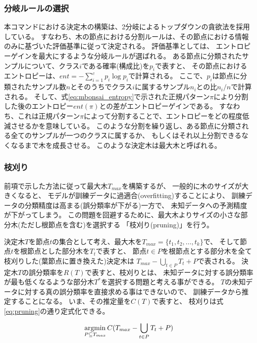 \subsubsection{分岐ルールの選択}
本コマンドにおける決定木の構築は、2分岐によるトップダウンの貪欲法を採用している。
すなわち、木の節点における分割ルールは、その節点における情報のみに基づいた評価基準に従って決定される。
評価基準としては、
エントロピーゲインを最大にするような分岐ルールが選ばれる。
ある節点に分類されたサンプルについて、クラス$i$である確率(構成比)を$p_i$で表すと、
その節点におけるエントロピーは、$ent=-\sum_{i=1}^c p_i \log{p_i}$で計算される。
ここで、$p_i$は節点に分類されたサンプル数$n$とそのうちでクラス$i$に属するサンプル$n_i$との比$n_i/n$で計算される。
そして、式\ref{eq:mbonsai_entropy}で示された正規パターン$\pi$により分割した後のエントロピー$ent(\pi)$との差がエントロピーゲインである。
すなわち、これは正規パターン$\pi$によって分割することで、エントロピーをどの程度低減させるかを意味している。
このような分割を繰り返し、ある節点に分類される全てのサンプルが一つのクラスに属するか、
もしくはそれ以上分割できるなくなるまで木を成長させる。
このような決定木は最大木と呼ばれる。

\subsubsection{枝刈り}
前項で示した方法に従って最大木$T_{max}$を構築するが、
一般的に木のサイズが大きくなると、
モデルが訓練データに過適合(overfitting)することにより、
訓練データの分類精度は高まる(誤分類率が下がる)一方で、
未知データへの予測精度が下がってしまう。
この問題を回避するために、最大木よりサイズの小さな部分木(ただし根節点を含む)を選択する
「枝刈り(pruning)」を行う。

決定木$T$を節点$t$の集合として考え、最大木を$T_{max}=\{t_1,t_2,\dots,t_k\}$で、
そして節点$t$を根節点とした部分木を$T_t$で表すと、
節点$t\in P$を根節点とする部分木を全て枝刈りした(葉節点に置き換えた)決定木は
$T_{max}-\bigcup_{t\in P} T_t + P$で表される。
決定木$T$の誤分類率を$R(T)$で表すと、枝刈りとは、
未知データに対する誤分類率が最も低くなるような部分木$T^*$を選択する問題と考える事ができる。
$T$の未知データに対する真の誤分類率を直接求める事はできないので、
訓練データから推定することになる。
いま、その推定量を$C(T)$で表すと、
枝刈りは式\ref{eq:pruning}の通り定式化できる。

\begin{equation}
\mathop{\rm argmin}\limits_{P\subseteq T_{max}} C(T_{max}-\bigcup_{t\in P} T_{t} + P)
\label{eq:pruning}
\end{equation}

